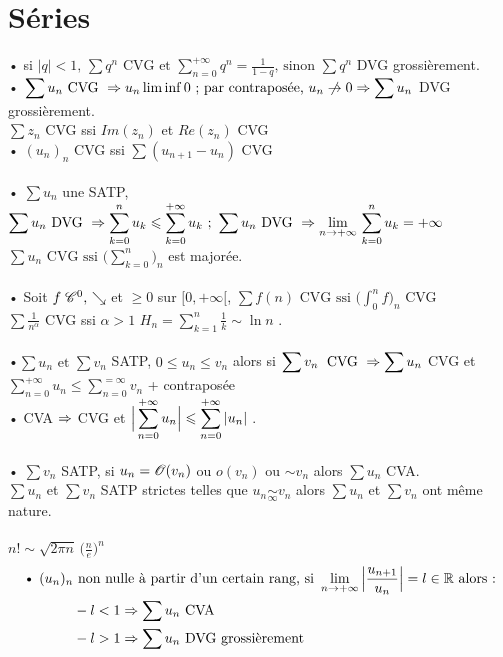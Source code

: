 \documentclass[12 pt]{book}
\begin{document}
\section*{Séries}
• si $\displaystyle{|q| < 1, \, \sum q^n\text{ CVG et }\sum_{n=0}^{+\infty} q^n = \frac{1}{1-q}\text{, sinon } \sum q^n}$ DVG grossièrement.\\
• $\displaystyle{\sum u_n \text{ CVG } \Ra u_n\liminf 0}\text{ ; par contraposée, }u_n\centernot\ra 0 \Ra \sum u_n $ DVG grossièrement.\\
$\displaystyle{\sum z_n}$ CVG ssi $Im(z_n)$ et $Re(z_n)$ CVG\\
• $(u_n)_n$ CVG ssi $\displaystyle{\sum (u_{n+1} - u_n)}$ CVG\\
\text{}\\
• $\displaystyle{\sum u_n}$ une SATP, \;$\displaystyle{\sum u_n \text{ DVG }\Rightarrow\sum_{k=0}^n  u_k \leqslant \sum_{k=0}^{+\infty} u_k \ ; \ \sum u_n \text{ DVG } \Rightarrow\lim_{n \to +\infty}\, \sum_{k=0}^n u_k = +\infty}$\\
$\displaystyle{\sum u_n\text{ CVG ssi } \Big(\sum_{k=0}^n\Big)_n}$ est majorée.\\
\text{}\\
• Soit $f \; \mathscr{C}^0, \, \searrow$ et $\geqslant 0$ sur $[0, +\infty[$, $\displaystyle{\sum f(n) \text{ CVG ssi } \Big(\int_0^n f \Big)_n}$ CVG\\
$\displaystyle{\sum \frac{1}{n^\alpha}}$ CVG ssi $\alpha > 1$ \qquad $\displaystyle{H_n = \sum_{k=1}^n \frac{1}{k}  \sim \ln{n}}$ .\\
\text{}\\
•$\displaystyle{\sum u_n\text{ et } \sum v_n}$ SATP, $0\leqslant u_n \leqslant v_n$ alors si $\displaystyle{\sum v_n \; \text{ CVG } \Rightarrow\sum u_n}$ CVG et $\displaystyle{\sum_{n=0}^{+\infty} u_n \leqslant  \sum_{n=0}^{=\infty} v_n}$ + contraposée\\
• CVA $\Rightarrow$ CVG et $\displaystyle{\Big| \sum_{n=0}^{+\infty} u_n \Big| \leqslant \sum_{n=0}^{+\infty}|u_n|}$ .\\
\text{}\\
• $\sum v_n$ SATP, si $u_n = \mathscr{O} (v_n)$ ou $o(v_n)$ ou $\sim v_n$ alors $\sum u_n$ CVA.\\
$\sum u_n$ et $\sum v_n$ SATP strictes telles que $u_n \underset{\infty}{\sim} v_n$ alors $\sum u_n$ et $\sum v_n$ ont même nature.\\
\text{}\\
$n! \sim \sqrt{2\pi n}\, \Big(\frac{n}{e}\Big)^n$\\
\begin{equation*}
\begin{aligned}
\text{• }(u_n)_n &\text{ non nulle à partir d'un certain rang, si } \lim_{n\to +\infty} \Big|\frac{u_{n+1}}{u_n} \Big| = l\in\mathbb{R}\text{ alors :}\\
& - l<1 \Rightarrow \sum u_n \text{ CVA}\\
& - l>1 \Rightarrow \sum u_n \text{ DVG grossièrement}\\
\end{aligned}
\end{equation*}
\end{document}
